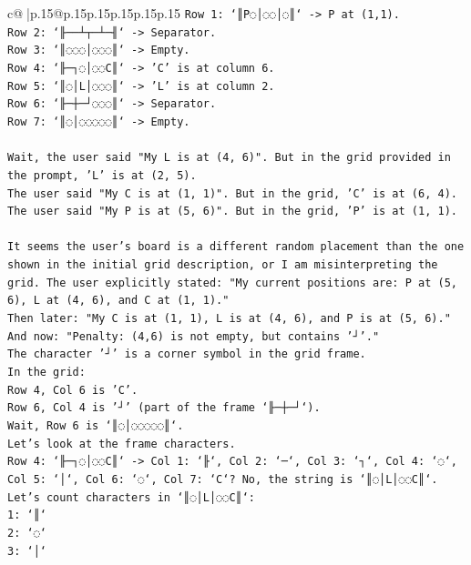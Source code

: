 \documentclass{article}
\begin{document}
{\begin{supertabular}{c@{$\;$}|p{.15\linewidth}@{}p{.15\linewidth}p{.15\linewidth}p{.15\linewidth}p{.15\linewidth}p{.15\linewidth}}
{{{\texttt{Row 1: `║P◌│◌◌│◌║` {-}> P at (1,1).} \\
\texttt{Row 2: `╟──┴┬─┴─╢` {-}> Separator.} \\
\texttt{Row 3: `║◌◌◌│◌◌◌║` {-}> Empty.} \\
\texttt{Row 4: `╟─┐◌│◌◌C║` {-}> 'C' is at column 6.} \\
\texttt{Row 5: `║◌│L│◌◌◌║` {-}> 'L' is at column 2.} \\
\texttt{Row 6: `╟─┼─┘◌◌◌║` {-}> Separator.} \\
\texttt{Row 7: `║◌│◌◌◌◌◌║` {-}> Empty.} \\
\\ 
\texttt{Wait, the user said "My L is at (4, 6)". But in the grid provided in the prompt, 'L' is at (2, 5).} \\
\texttt{The user said "My C is at (1, 1)". But in the grid, 'C' is at (6, 4).} \\
\texttt{The user said "My P is at (5, 6)". But in the grid, 'P' is at (1, 1).} \\
\\ 
\texttt{It seems the user's board is a different random placement than the one shown in the initial grid description, or I am misinterpreting the grid. The user explicitly stated: "My current positions are: P at (5, 6), L at (4, 6), and C at (1, 1)."} \\
\texttt{Then later: "My C is at (1, 1), L is at (4, 6), and P is at (5, 6)."} \\
\texttt{And now: "Penalty: (4,6) is not empty, but contains '┘'."} \\
\texttt{The character '┘' is a corner symbol in the grid frame.} \\
\texttt{In the grid:} \\
\texttt{Row 4, Col 6 is 'C'.} \\
\texttt{Row 6, Col 4 is '┘' (part of the frame `╟─┼─┘`).} \\
\texttt{Wait, Row 6 is `║◌│◌◌◌◌◌║`.} \\
\texttt{Let's look at the frame characters.} \\
\texttt{Row 4: `╟─┐◌│◌◌C║` {-}> Col 1: `╟`, Col 2: `─`, Col 3: `┐`, Col 4: `◌`, Col 5: `│`, Col 6: `◌`, Col 7: `C`? No, the string is `║◌│L│◌◌C║`.} \\
\texttt{Let's count characters in `║◌│L│◌◌C║`:} \\
\texttt{1: `║`} \\
\texttt{2: `◌`} \\
\texttt{3: `│`} \\
}}}
\end{supertabular}}
\end{document}
